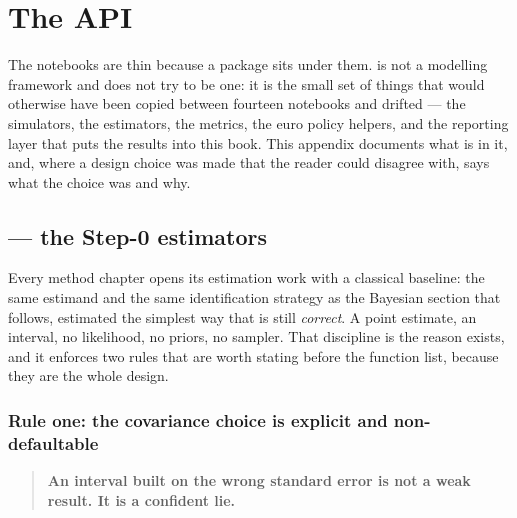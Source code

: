 %
\chapter{The  API}
\label{app:cmp}

The notebooks are thin because a package sits under them.  is not a modelling framework
and does not try to be one: it is the small set of things that would otherwise have been copied
between fourteen notebooks and drifted --- the simulators, the estimators, the metrics, the euro
policy helpers, and the reporting layer that puts the results into this book. This appendix
documents what is in it, and, where a design choice was made that the reader could disagree with,
says what the choice was and why.

\section{ --- the Step-0 estimators}
\label{app:cmp:classical}

Every method chapter opens its estimation work with a classical baseline: the same estimand and the
same identification strategy as the Bayesian section that follows, estimated the simplest way that
is still \emph{correct}. A point estimate, an interval, no likelihood, no priors, no sampler. That
discipline is the reason  exists, and it enforces two rules that are worth
stating before the function list, because they are the whole design.

\subsection*{Rule one: the covariance choice is explicit and non-defaultable}

\begin{quote}
\textbf{An interval built on the wrong standard error is not a weak result. It is a confident
lie.}
\end{quote}

